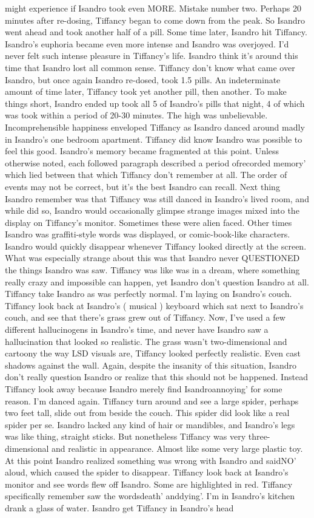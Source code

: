 \documentclass[12pt]{book}
\begin{document}
might experience if Isandro took even MORE. Mistake number two. Perhaps 20 minutes after re-dosing, Tiffancy began to come down from the peak. So Isandro went ahead and took another half of a pill. Some time later, Isandro hit Tiffancy. Isandro's euphoria became even more intense and Isandro was overjoyed. I'd never felt such intense pleasure in Tiffancy's life. Isandro think it's around this time that Isandro lost all common sense. Tiffancy don't know what came over Isandro, but once again Isandro re-dosed, took 1.5 pills. An indeterminate amount of time later, Tiffancy took yet another pill, then another. To make things short, Isandro ended up took all 5 of Isandro's pills that night, 4 of which was took within a period of 20-30 minutes. The high was unbelievable. Incomprehensible happiness enveloped Tiffancy as Isandro danced around madly in Isandro's one bedroom apartment. Tiffancy did know Isandro was possible to feel this good. Isandro's memory became fragmented at this point. Unless otherwise noted, each followed paragraph described a period ofrecorded memory' which lied between that which Tiffancy don't remember at all. The order of events may not be correct, but it's the best Isandro can recall. Next thing Isandro remember was that Tiffancy was still danced in Isandro's lived room, and while did so, Isandro would occasionally glimpse strange images mixed into the display on Tiffancy's monitor. Sometimes these were alien faced. Other times Isandro was graffiti-style words was displayed, or comic-book-like characters. Isandro would quickly disappear whenever Tiffancy looked directly at the screen. What was especially strange about this was that Isandro never QUESTIONED the things Isandro was saw. Tiffancy was like was in a dream, where something really crazy and impossible can happen, yet Isandro don't question Isandro at all. Tiffancy take Isandro as was perfectly normal. I'm laying on Isandro's couch. Tiffancy look back at Isandro's ( musical ) keyboard which sat next to Isandro's couch, and see that there's grass grew out of Tiffancy. Now, I've used a few different hallucinogens in Isandro's time, and never have Isandro saw a hallucination that looked so realistic. The grass wasn't two-dimensional and cartoony the way LSD visuals are, Tiffancy looked perfectly realistic. Even cast shadows against the wall. Again, despite the insanity of this situation, Isandro don't really question Isandro or realize that this should not be happened. Instead Tiffancy look away because Isandro merely find Isandroannoying' for some reason. I'm danced again. Tiffancy turn around and see a large spider, perhaps two feet tall, slide out from beside the couch. This spider did look like a real spider per se. Isandro lacked any kind of hair or mandibles, and Isandro's legs was like thing, straight sticks. But nonetheless Tiffancy was very three-dimensional and realistic in appearance. Almost like some very large plastic toy. At this point Isandro realized something was wrong with Isandro and saidNO' aloud, which caused the spider to disappear. Tiffancy look back at Isandro's monitor and see words flew off Isandro. Some are highlighted in red. Tiffancy specifically remember saw the wordsdeath' anddying'. I'm in Isandro's kitchen drank a glass of water. Isandro get Tiffancy in Isandro's head 
\end{document}
